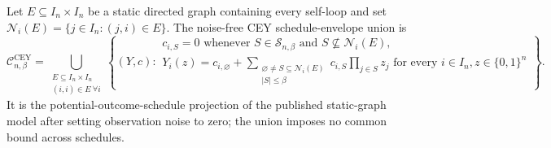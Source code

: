 Let \(E\subseteq I_n\times I_n\) be a static directed graph containing every self-loop and set \(\mathcal N_i(E)=\{j\in I_n:(j,i)\in E\}\).  The noise-free CEY schedule-envelope union is
\[
\mathcal C^{\mathrm{CEY}}_{n,\beta}
=\bigcup_{\substack{E\subseteq I_n\times I_n\\(i,i)\in E\ \forall i}}
\left\{(Y,c):
\begin{array}{l}
c_{i,S}=0\text{ whenever }S\in\mathcal S_{n,\beta}\text{ and }S\nsubseteq\mathcal N_i(E),\\
Y_i(z)=c_{i,\varnothing}+\displaystyle\sum_{\substack{\varnothing\ne S\subseteq\mathcal N_i(E)\\|S|\le\beta}}c_{i,S}\prod_{j\in S}z_j
\text{ for every }i\in I_n, z\in\{0,1\}^n
\end{array}\right\}.
\]
It is the potential-outcome-schedule projection of the published static-graph model after setting observation noise to zero; the union imposes no common bound across schedules.